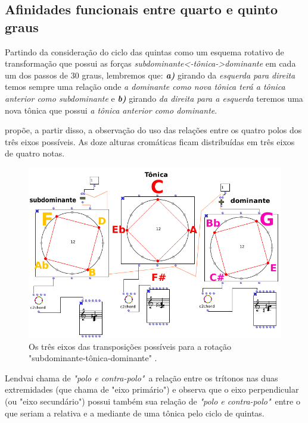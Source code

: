 \documentclass[
	12pt,				%
	openright,			%
	twoside,			%
	a4paper,			%
	english,			%
	french,				%
	spanish,			%
	brazil				%
	]{abntex2}
\begin{document}
\subsection{Afinidades funcionais entre quarto e quinto graus}

Partindo da consideração do ciclo das quintas como um esquema rotativo de transformação que possui as forças \textit{subdominante<-tônica->dominante} em cada um dos passos de 30 graus, lembremos que: \textbf{\textit{a)}} girando da \textit{esquerda para direita} temos sempre uma relação onde \textit{a dominante como nova tônica terá a tônica anterior como subdominante} e  \textbf{\textit{b)}} girando \textit{da direita para a esquerda} teremos uma nova tônica que possui \textit{a tônica anterior como dominante}. 

 propõe, a partir disso, a observação do uso das relações entre os quatro polos dos três eixos possíveis. As doze alturas cromáticas ficam distribuídas em três eixos de quatro notas. 

\begin{figure}[!h]
	\caption{\label{fig_grafico}Os três eixos das transposições possíveis para a rotação "subdominante-tônica-dominante" .}
	\begin{center}
	    \includegraphics[scale=0.45]{axis/axisOM.png}
	\end{center}
\end{figure}


Lendvai chama de \textit{"polo e contra-polo"}\ a relação entre os trítonos nas duas extremidades (que chama de "eixo primário") e observa que o eixo perpendicular (ou "eixo secundário") possui também sua relação de \textit{"polo e contra-polo"}\ entre o que seriam a relativa e a mediante de uma tônica pelo ciclo de quintas. 
\end{document}
